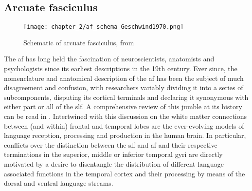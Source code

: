 \subsection{Arcuate fasciculus}

%

\begin{SCfigure}[][htb!]
  \texttt{[image: chapter\_2/af\_schema\_Geschwind1970.png]}
  \caption{ Schematic of arcuate fasciculus, from \textcite{Geschwind1970}}
  \label{fig:af}
\end{SCfigure}

The \gls{af} has long held the fascination of neuroscientists, anatomists and psychologists since its earliest descriptions in the 19th century.\autocite{Burdach1822}
Ever since, the nomenclature and anatomical description of the \gls{af} has been the subject of much disagreement and confusion, with researchers variably dividing it into a series of subcomponents, disputing its cortical terminals and declaring it synonymous with either part or all of the \gls{slf}.
A comprehensive review of this jumble at its history can be read in \textcite{PortodeOliveira2021}.
Intertwined with this discussion on the white matter connections between (and within) frontal and temporal lobes are the ever-evolving models of language reception, processing and production in the human brain.\autocite{Becker2022a}
In particular, conflicts over the distinction between the \gls{slf} and \gls{af} and their respective terminations in the superior, middle or inferior temporal gyri are directly motivated by a desire to disentangle the distribution of different language associated functions in the temporal cortex and their processing by means of the dorsal and ventral language streams.\autocite{Hickok2004,Friederici2013a,Kljajevic2014a,Giampiccolo2022a,Becker2022a}

